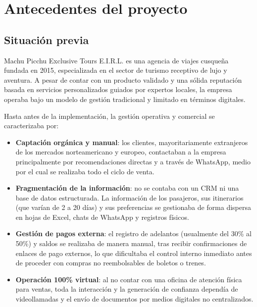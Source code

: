 \section{Antecedentes del proyecto}

\subsection{Situación previa}

\begin{indentedsubsection}
Machu Picchu Exclusive Tours E.I.R.L. es una agencia de viajes cusqueña fundada en 2015, especializada en el sector de turismo receptivo de lujo y aventura. A pesar de contar con un producto validado y una sólida reputación basada en servicios personalizados guiados por expertos locales, la empresa operaba bajo un modelo de gestión tradicional y limitado en términos digitales.

Hasta antes de la implementación, la gestión operativa y comercial se caracterizaba por:

\begin{itemize}
    \item \textbf{Captación orgánica y manual}: los clientes, mayoritariamente extranjeros de los mercados norteamericano y europeo, contactaban a la empresa principalmente por recomendaciones directas y a través de WhatsApp, medio por el cual se realizaba todo el ciclo de venta.
    \item \textbf{Fragmentación de la información}: no se contaba con un CRM ni una base de datos estructurada. La información de los pasajeros, sus itinerarios (que varían de 2 a 20 días) y sus preferencias se gestionaba de forma dispersa en hojas de Excel, chats de WhatsApp y registros físicos.
    \item \textbf{Gestión de pagos externa}: el registro de adelantos (usualmente del 30\% al 50\%) y saldos se realizaba de manera manual, tras recibir confirmaciones de enlaces de pago externos, lo que dificultaba el control interno inmediato antes de proceder con compras no reembolsables de boletos o trenes.
    \item \textbf{Operación 100\% virtual}: al no contar con una oficina de atención física para ventas, toda la interacción y la generación de confianza dependía de videollamadas y el envío de documentos por medios digitales no centralizados.
\end{itemize}

\end{indentedsubsection}

